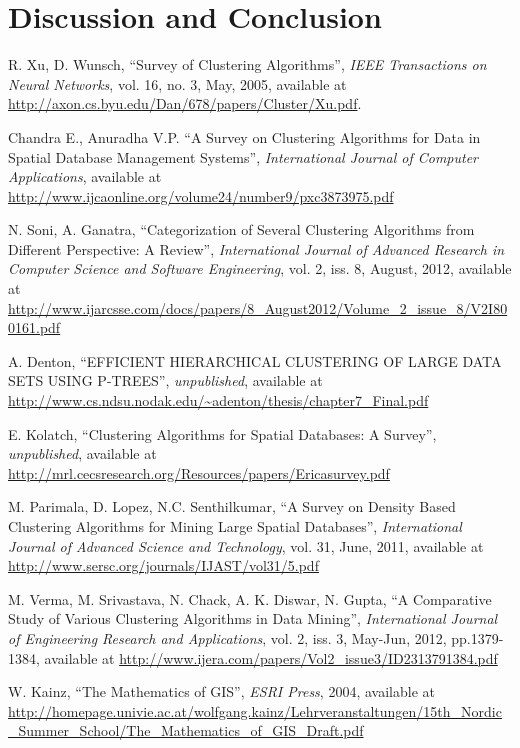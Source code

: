 \documentclass[conference, 10pt]{IEEEtran}
\begin{document}
\section{Discussion and Conclusion}


\newpage
\begin{thebibliography}{1}

 R. Xu, D. Wunsch, ``Survey of Clustering Algorithms'', \emph{IEEE Transactions on Neural Networks}, vol. 16, no. 3, May, 2005, available at 
\url{http://axon.cs.byu.edu/Dan/678/papers/Cluster/Xu.pdf}.

 Chandra E., Anuradha V.P. ``A Survey on Clustering Algorithms for Data in Spatial Database Management Systems'', \emph{International Journal of Computer Applications}, available at
\url{http://www.ijcaonline.org/volume24/number9/pxc3873975.pdf}

 N. Soni, A. Ganatra, ``Categorization of Several Clustering Algorithms from Different Perspective: A Review'', \emph{International Journal of Advanced Research in Computer Science and Software Engineering}, vol. 2, iss. 8, August, 2012, available at
\url{http://www.ijarcsse.com/docs/papers/8_August2012/Volume_2_issue_8/V2I800161.pdf}

 A. Denton, ``EFFICIENT HIERARCHICAL CLUSTERING OF LARGE DATA SETS USING P-TREES'', \emph{unpublished}, available at
\url{http://www.cs.ndsu.nodak.edu/~adenton/thesis/chapter7_Final.pdf}

 E. Kolatch, ``Clustering Algorithms for Spatial Databases: A Survey'', \emph{unpublished}, available at
\url{http://mrl.cecsresearch.org/Resources/papers/Ericasurvey.pdf}

 M. Parimala, D. Lopez, N.C. Senthilkumar, ``A Survey on Density Based Clustering Algorithms for Mining Large Spatial Databases'', \emph{International Journal of Advanced Science and Technology}, vol. 31, June, 2011, available at
\url{http://www.sersc.org/journals/IJAST/vol31/5.pdf}

 M. Verma, M. Srivastava, N. Chack, A. K. Diswar, N. Gupta, ``A Comparative Study of Various Clustering Algorithms in Data Mining'', \emph{International Journal of Engineering Research and Applications}, vol. 2, iss. 3, May-Jun, 2012, pp.1379-1384, available at
\url{http://www.ijera.com/papers/Vol2_issue3/ID2313791384.pdf}

 W. Kainz, ``The Mathematics of GIS'', \emph{ESRI Press}, 2004, available at
\url{http://homepage.univie.ac.at/wolfgang.kainz/Lehrveranstaltungen/15th_Nordic_Summer_School/The_Mathematics_of_GIS_Draft.pdf}


\end{thebibliography}
\end{document}
